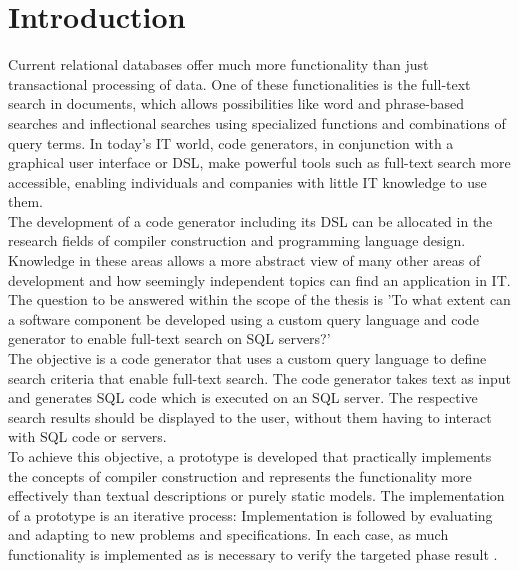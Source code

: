 \section{Introduction}
Current relational databases offer much more functionality than just transactional processing of data. One of these functionalities is the full-text search in documents, which allows possibilities like word and phrase-based searches and inflectional searches using specialized functions and combinations of query terms. In today's IT world, code generators, in conjunction with a graphical user interface or \ac{DSL}, make powerful tools such as full-text search more accessible, enabling individuals and companies with little IT knowledge to use them.\\
The development of a code generator including its \ac{DSL} can be allocated in the research fields of compiler construction and programming language design. Knowledge in these areas allows a more abstract view of many other areas of development and how seemingly independent topics can find an application in IT. The question to be answered within the scope of the thesis is 'To what extent can a software component be developed using a custom query language and code generator to enable full-text search on \ac{SQL} servers?'\\
The objective is a code generator that uses a custom query language to define search criteria that enable full-text search. The code generator takes text as input and generates \ac{SQL} code which is executed on an \ac{SQL} server. The respective search results should be displayed to the user, without them having to interact with \ac{SQL} code or servers.\\
To achieve this objective, a prototype is developed that practically implements the concepts of compiler construction and represents the functionality more effectively than textual descriptions or purely static models. The implementation of a prototype is an iterative process: Implementation is followed by evaluating and adapting to new problems and specifications. In each case, as much functionality is implemented as is necessary to verify the targeted phase result \parencite[cf.][p. 3]{pomberger_methoden_1992}.